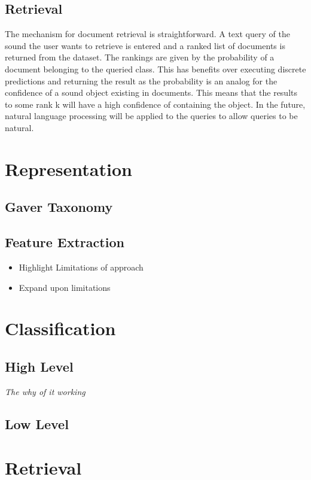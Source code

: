 \subsection{Retrieval}
The mechanism for document retrieval is straightforward. A text query of the sound the user wants to retrieve is entered and a ranked list of documents is returned from the dataset. The rankings are given by the probability of a document belonging to the queried class. This has benefits over executing discrete predictions and returning the result as the probability is an analog for the confidence of a sound object existing in documents. This means that the results to some rank k will have a high confidence of containing the object. In the future, natural language processing will be applied to the queries to allow queries to be natural.

\section{Representation}

\subsection{Gaver Taxonomy}

\subsection{Feature Extraction}

\begin{itemize}
    \item Highlight Limitations of approach
    \item Expand upon limitations
\end{itemize}

\section{Classification}

\subsection{High Level}
    \textit{The why of it working}
    
\subsection{Low Level}

\section{Retrieval}

